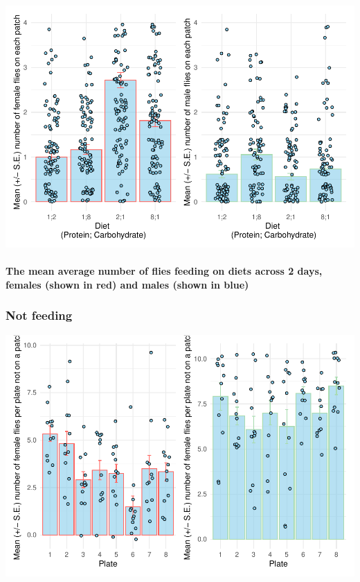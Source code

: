 \documentclass[
]{article}
\begin{document}
\includegraphics{Drosophila-project_files/figure-latex/unnamed-chunk-3-1.pdf}

\hypertarget{the-mean-average-number-of-flies-feeding-on-diets-across-2-days-females-shown-in-red-and-males-shown-in-blue}{%
\paragraph{The mean average number of flies feeding on diets across 2
days, females (shown in red) and males (shown in
blue)}\label{the-mean-average-number-of-flies-feeding-on-diets-across-2-days-females-shown-in-red-and-males-shown-in-blue}}

\hypertarget{not-feeding}{%
\subsubsection{Not feeding}\label{not-feeding}}

\includegraphics{Drosophila-project_files/figure-latex/unnamed-chunk-4-1.pdf}
\end{document}
